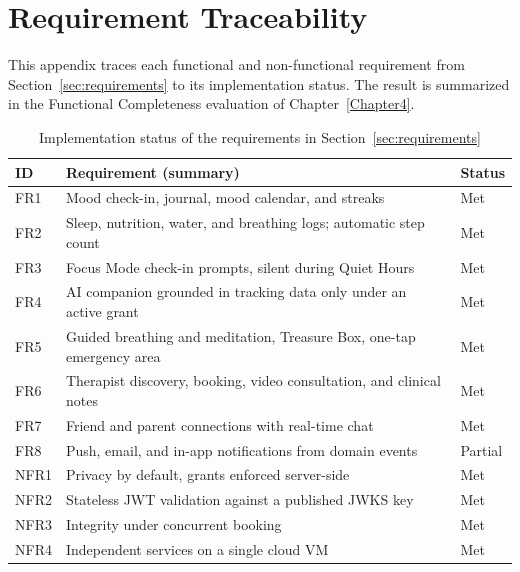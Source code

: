 \chapter{Requirement Traceability}
\label{Appendix3}

This appendix traces each functional and non-functional requirement from Section~\ref{sec:requirements} to its implementation status. The result is summarized in the Functional Completeness evaluation of Chapter~\ref{Chapter4}.

\begin{table}[htbp]
  \centering
  \caption{Implementation status of the requirements in Section~\ref{sec:requirements}}
  \label{tab:traceability}
  \begin{tabular}{|l|p{8.2cm}|l|}
    \hline
    \textbf{ID} & \textbf{Requirement (summary)} & \textbf{Status} \\
    \hline
    FR1 & Mood check-in, journal, mood calendar, and streaks & Met \\
    \hline
    FR2 & Sleep, nutrition, water, and breathing logs; automatic step count & Met \\
    \hline
    FR3 & Focus Mode check-in prompts, silent during Quiet Hours & Met \\
    \hline
    FR4 & AI companion grounded in tracking data only under an active grant & Met \\
    \hline
    FR5 & Guided breathing and meditation, Treasure Box, one-tap emergency area & Met \\
    \hline
    FR6 & Therapist discovery, booking, video consultation, and clinical notes & Met \\
    \hline
    FR7 & Friend and parent connections with real-time chat & Met \\
    \hline
    FR8 & Push, email, and in-app notifications from domain events & Partial \\
    \hline
    NFR1 & Privacy by default, grants enforced server-side & Met \\
    \hline
    NFR2 & Stateless JWT validation against a published JWKS key & Met \\
    \hline
    NFR3 & Integrity under concurrent booking & Met \\
    \hline
    NFR4 & Independent services on a single cloud VM & Met \\
    \hline
  \end{tabular}
\end{table}
